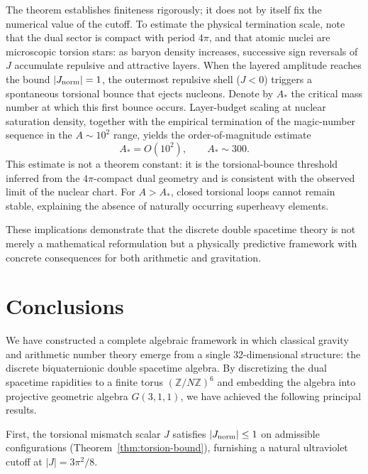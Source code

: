 \documentclass[dvipdfmx,a4paper]{article}
\theoremstyle{definition}
\theoremstyle{remark}
\newcommand{\Jnorm}{J_{\rm norm}}
\begin{document}
The theorem establishes finiteness rigorously; it does not by itself fix the numerical value of the cutoff. To estimate the physical termination scale, note that the dual sector is compact with period \(4\pi\), and that atomic nuclei are microscopic torsion stars: as baryon density increases, successive sign reversals of \(J\) accumulate repulsive and attractive layers. When the layered amplitude reaches the bound \(|\Jnorm| = 1\), the outermost repulsive shell (\(J < 0\)) triggers a spontaneous torsional bounce that ejects nucleons. Denote by \(A_*\) the critical mass number at which this first bounce occurs. Layer-budget scaling at nuclear saturation density, together with the empirical termination of the magic-number sequence in the \(A \sim 10^2\) range, yields the order-of-magnitude estimate
\[
A_* = O(10^2), \qquad A_* \sim 300.
\]
This estimate is not a theorem constant: it is the torsional-bounce threshold inferred from the \(4\pi\)-compact dual geometry and is consistent with the observed limit of the nuclear chart. For \(A > A_*\), closed torsional loops cannot remain stable, explaining the absence of naturally occurring superheavy elements.

These implications demonstrate that the discrete double spacetime theory is not merely a mathematical reformulation but a physically predictive framework with concrete consequences for both arithmetic and gravitation.

\section{Conclusions}

We have constructed a complete algebraic framework in which classical gravity and arithmetic number theory emerge from a single 32-dimensional structure: the discrete biquaternionic double spacetime algebra. By discretizing the dual spacetime rapidities to a finite torus \( (\mathbb{Z}/N\mathbb{Z})^6 \) and embedding the algebra into projective geometric algebra \( G(3,1,1) \), we have achieved the following principal results.

First, the torsional mismatch scalar \( J \) satisfies \(|\Jnorm| \leq 1\) on admissible configurations (Theorem~\ref{thm:torsion-bound}), furnishing a natural ultraviolet cutoff at \(|J| = 3\pi^2/8\).
\end{document}
